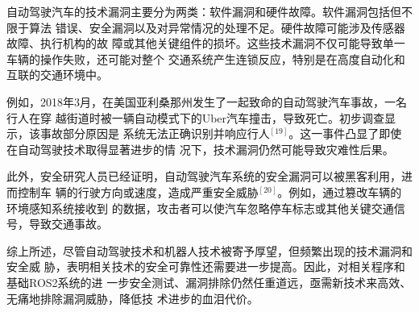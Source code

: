 自动驾驶汽车的技术漏洞主要分为两类：软件漏洞和硬件故障。软件漏洞包括但不限于算法
错误、安全漏洞以及对异常情况的处理不足。硬件故障可能涉及传感器故障、执行机构的故
障或其他关键组件的损坏。这些技术漏洞不仅可能导致单一车辆的操作失败，还可能对整个
交通系统产生连锁反应，特别是在高度自动化和互联的交通环境中。

例如，2018年3月，在美国亚利桑那州发生了一起致命的自动驾驶汽车事故，一名行人在穿
越街道时被一辆自动模式下的Uber汽车撞击，导致死亡。初步调查显示，该事故部分原因是
系统无法正确识别并响应行人$^{[19]}$。这一事件凸显了即使在自动驾驶技术取得显著进步的情
况下，技术漏洞仍然可能导致灾难性后果。

此外，安全研究人员已经证明，自动驾驶汽车系统的安全漏洞可以被黑客利用，进而控制车
辆的行驶方向或速度，造成严重安全威胁$^{[20]}$。例如，通过篡改车辆的环境感知系统接收到
的数据，攻击者可以使汽车忽略停车标志或其他关键交通信号，导致交通事故。

综上所述，尽管自动驾驶技术和机器人技术被寄予厚望，但频繁出现的技术漏洞和安全威
胁，表明相关技术的安全可靠性还需要进一步提高。因此，对相关程序和基础ROS2系统的进
一步安全测试、漏洞排除仍然任重道远，亟需新技术来高效、无痛地排除漏洞威胁，降低技
术进步的血泪代价。

